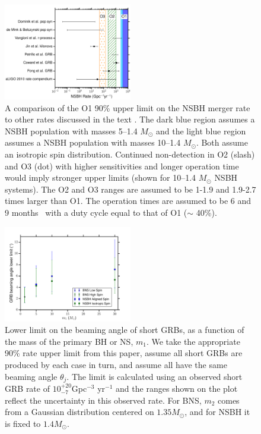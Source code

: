 \documentclass[twocolumn]{aastex6}
\begin{document}
\begin{figure}[t]
\centering
\includegraphics[width=0.5\textwidth]{figure7}
\caption{\label{fig:ratecomparensbh} A comparison of the \ac{O1} 90\% upper limit on
the \ac{NSBH} merger rate to other rates discussed in
the text \protect\citep{Abadie:2010cf, Fong:2015oha, Coward:2012gn,
Petrillo:2012ij, Jin:2015txa, Vangioni:2015ofa, deMink:2015yea, Dominik:2014yma}.
The dark blue region assumes a \ac{NSBH} population with masses 5--1.4 $M_{\odot}$ and the
light blue region assumes a \ac{NSBH} population with masses 10--1.4 $M_{\odot}$.
Both assume an isotropic spin distribution.
Continued non-detection in O2 (slash) and O3 (dot) with higher sensitivities and longer
operation time would imply stronger upper limits (shown for 10--1.4 $M_{\odot}$ \ac{NSBH}
systems). 
The O2 and O3 ranges are assumed to be 1-1.9 and 1.9-2.7 times larger than
\ac{O1}. 
The operation times are assumed to be 6 and 9 months~\citep{Aasi:2013wya}
with a duty cycle equal to that of \ac{O1} ($\sim$ 40\%).}
\end{figure}

\begin{figure}[t]
\centering
\includegraphics[width=0.5\textwidth]{figure8.pdf}
\caption{\label{fig:beaming} Lower limit on the beaming angle of short
\acp{GRB}, as a function of the mass of the primary BH or
NS, $m_1$. We take the appropriate  90\% rate upper limit from this paper, 
assume all short \acp{GRB} are produced by each case in turn, and assume all
have the same beaming angle $\theta_j$. The limit is calculated using an
observed short \ac{GRB} rate of
$10^{+20}_{-7}$Gpc$^{-3}$ yr$^{-1}$
and the ranges shown on the plot reflect the uncertainty in this observed rate.
For \ac{BNS}, $m_2$ comes from a Gaussian distribution centered on $1.35M_\odot$, and
for \ac{NSBH} it is fixed to $1.4M_\odot$.}
\end{figure}
\end{document}
